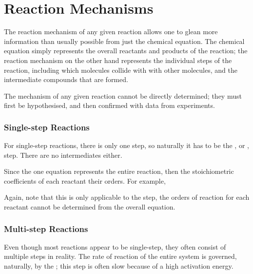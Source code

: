 

\pagebreak
\part{Reaction Mechanisms}

	The reaction mechanism of any given reaction allows one to glean more information than usually possible from just the chemical equation.
	The chemical equation simply represents the overall reactants and products of the reaction; the reaction mechanism on the other hand
	represents the individual steps of the reaction, including which molecules collide with with other molecules, and the intermediate
	compounds that are formed.

	The mechanism of any given reaction cannot be directly determined; they must first be hypothesised, and then confirmed with data from
	experiments.


	\section{Single-step Reactions}

		For single-step reactions, there is only one step, so naturally it has to be the , or , step.
		There are no intermediates either.

		Since the one equation represents the entire reaction, then the stoichiometric coefficients of each reactant  their
		orders. For example,


		Again, note that this is only applicable to the  step, the orders of reaction for each reactant cannot be
		determined from the overall equation.




	\pagebreak
	\section{Multi-step Reactions}

		Even though most reactions appear to be single-step, they often consist of multiple steps in reality. The rate of reaction of the entire
		system is governed, naturally, by the ; this step is often slow because of a high activation energy.

